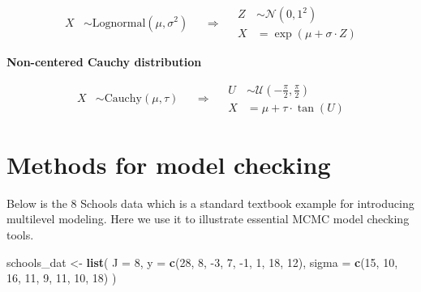 \documentclass[11pt, oneside, openany]{scrbook}
\newenvironment{Shaded}{\begin{snugshade}}{\end{snugshade}}
\newcommand{\DataTypeTok}[1]{\textcolor[rgb]{0.13,0.29,0.53}{#1}}
\newcommand{\DecValTok}[1]{\textcolor[rgb]{0.00,0.00,0.81}{#1}}
\newcommand{\KeywordTok}[1]{\textcolor[rgb]{0.13,0.29,0.53}{\textbf{#1}}}
\newcommand{\NormalTok}[1]{#1}
\newcommand{\StringTok}[1]{\textcolor[rgb]{0.31,0.60,0.02}{#1}}
\begin{document}
\begin{equation}
  \begin{split}
    X &\sim \mathrm{Lognormal}(\mu, \sigma^2)
  \end{split}
\quad \Longrightarrow \quad
  \begin{split}
    Z &\sim \mathcal{N}(0, 1^2) \\
    X &= \exp\left(\mu + \sigma \cdot Z\right)
  \end{split}
\label{eq:nc-lognormal}
\end{equation}

\textbf{Non-centered Cauchy distribution}


\begin{equation}
  \begin{split}
    X &\sim \mathrm{Cauchy}(\mu, \tau)
  \end{split}
\quad \Longrightarrow \quad
  \begin{split}
    U &\sim \mathcal{U}\left(-\frac{\pi}{2}, \frac{\pi}{2}\right) \\
    X &= \mu + \tau \cdot \tan(U)
  \end{split}
\label{eq:nc-cauchy}
\end{equation}

\hypertarget{model-checking}{%
\section{Methods for model checking}\label{model-checking}}

Below is the 8 Schools data \citep{gelman2013bayesian} which is a standard textbook example for introducing multilevel modeling. Here we use it to illustrate essential MCMC model checking tools.

\begin{Shaded}
\begin{Highlighting}[]
\NormalTok{schools_dat <-}\StringTok{ }\KeywordTok{list}\NormalTok{(}
  \DataTypeTok{J =} \DecValTok{8}\NormalTok{,}
  \DataTypeTok{y =} \KeywordTok{c}\NormalTok{(}\DecValTok{28}\NormalTok{,  }\DecValTok{8}\NormalTok{, }\DecValTok{-3}\NormalTok{,  }\DecValTok{7}\NormalTok{, }\DecValTok{-1}\NormalTok{,  }\DecValTok{1}\NormalTok{, }\DecValTok{18}\NormalTok{, }\DecValTok{12}\NormalTok{),}
  \DataTypeTok{sigma =} \KeywordTok{c}\NormalTok{(}\DecValTok{15}\NormalTok{, }\DecValTok{10}\NormalTok{, }\DecValTok{16}\NormalTok{, }\DecValTok{11}\NormalTok{,  }\DecValTok{9}\NormalTok{, }\DecValTok{11}\NormalTok{, }\DecValTok{10}\NormalTok{, }\DecValTok{18}\NormalTok{)}
\NormalTok{)}
\end{Highlighting}
\end{Shaded}
\end{document}
